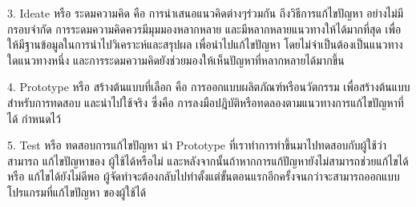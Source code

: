 3. Ideate หรือ ระดมความคิด คือ การนําเสนอแนวคิดต่างๆร่วมกัน ถึงวิธีการแก้ไขปัญหา อย่างไม่มี
กรอบจํากัด การระดมความคิดควรมีมุมมองหลากหลาย และมีหลากหลายแนวทางให้ได้มากที่สุด เพื่อ
ให้มีฐานข้อมูลในการนําไปวิเคราะห์และสรุปผล เพื่อนําไปแก้ไขปัญหา โดยไม่จําเป็นต้องเป็นแนวทาง
ใดแนวทางหนึ่ง และการระดมความคิดยังช่วยมองให้เห็นปัญหาที่หลากหลายได้มากขึ้น

4. Prototype หรือ สร้างต้นแบบที่เลือก คือ การออกแบบผลิตภัณฑ์หรือนวัตกรรม เพื่อสร้างต้นแบบสําหรับการทดสอบ และนําไปใช้จริง ซึ่งคือ การลงมือปฎิบัติหรือทดลองตามแนวทางการแก้ไขปัญหาที่ได้
กําหนดไว้

5. Test หรือ ทดสอบการแก้ไขปัญหา นํา Prototype ที่เราทําการทําขึ้นมาไปทดสอบกับผู้ใช้ว่าสามารถ
แก้ไขปัญหาของ ผู้ใช้ได้หรือไม่ และหลังจากนั้นถ้าหากการแก้ปัญหายังไม่สามารถช่วยแก้ไขได้ หรือ
แก้ไขได้ยังไม่ดีพอ ผู้จัดทําจะต้องกลับไปทําตั้งแต่ขั้นตอนแรกอีกครั้งจนกว่าจะสามารถออกแบบโปรแกรมที่แก้ไขปัญหา ของผู้ใช้ได้










